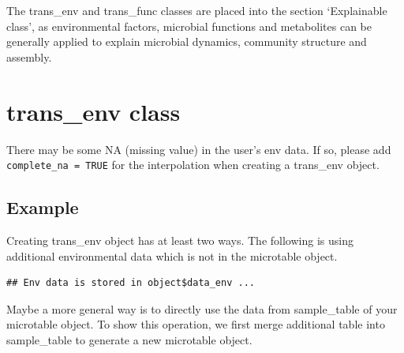 \documentclass[
]{book}
\newenvironment{Shaded}{\begin{snugshade}}{\end{snugshade}}
\newcommand{\AttributeTok}[1]{\textcolor[rgb]{0.13,0.29,0.53}{#1}}
\newcommand{\CommentTok}[1]{\textcolor[rgb]{0.56,0.35,0.01}{\textit{#1}}}
\newcommand{\DecValTok}[1]{\textcolor[rgb]{0.00,0.00,0.81}{#1}}
\newcommand{\FunctionTok}[1]{\textcolor[rgb]{0.13,0.29,0.53}{\textbf{#1}}}
\newcommand{\NormalTok}[1]{#1}
\newcommand{\OtherTok}[1]{\textcolor[rgb]{0.56,0.35,0.01}{#1}}
\newcommand{\SpecialCharTok}[1]{\textcolor[rgb]{0.81,0.36,0.00}{\textbf{#1}}}
\begin{document}
The trans\_env and trans\_func classes are placed into the section `Explainable class',
as environmental factors, microbial functions and metabolites can be generally applied to explain microbial dynamics, community structure and assembly.

\section{trans\_env class}\label{trans_env-class}

There may be some NA (missing value) in the user's env data.
If so, please add \texttt{complete\_na\ =\ TRUE} for the interpolation when creating a trans\_env object.

\subsection{Example}\label{example-8}

Creating trans\_env object has at least two ways.
The following is using additional environmental data which is not in the microtable object.

\begin{Shaded}
\end{Shaded}

\begin{verbatim}
## Env data is stored in object$data_env ...
\end{verbatim}

Maybe a more general way is to directly use the data from sample\_table of your microtable object.
To show this operation, we first merge additional table into sample\_table to generate a new microtable object.

\begin{Shaded}
\end{Shaded}
\end{document}
